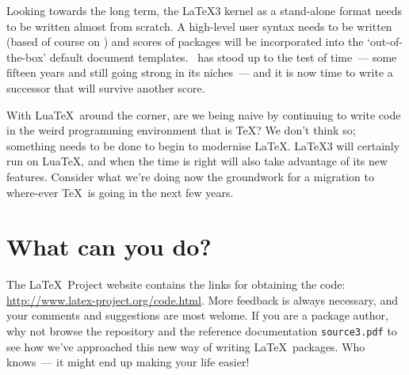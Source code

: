 \documentclass{ltnews}
\begin{document}
Looking towards the long term, the \LaTeX3 kernel as a stand-alone format needs to be written almost from scratch. A high-level user syntax needs to be written (based of course on \LaTeXe) and scores of packages will be incorporated into the `out-of-the-box' default document templates. \LaTeXe\ has stood up to the test of time~--- some fifteen years and still going strong in its niches~--- and it is now time to write a successor that will survive another score.

With Lua\TeX\ around the corner, are we being naive by continuing to write code in the weird programming environment that is \TeX? We don't think so; something needs to be done to begin to modernise \LaTeX. \LaTeX3 will certainly run on Lua\TeX, and when the time is right will also take advantage of its new features. Consider what we're doing now the groundwork for a migration to where-ever \TeX\ is going in the next few years.

\section{What can you do?}

The \LaTeX~Project website contains the links for obtaining the code: \url{http://www.latex-project.org/code.html}. More feedback is always necessary, and your comments and suggestions are most welome. If you are a package author, why not browse the repository and the reference documentation \texttt{source3.pdf} to see how we've approached this new way of writing \LaTeX\ packages. Who knows~--- it might end up making your life easier!
\end{document}
